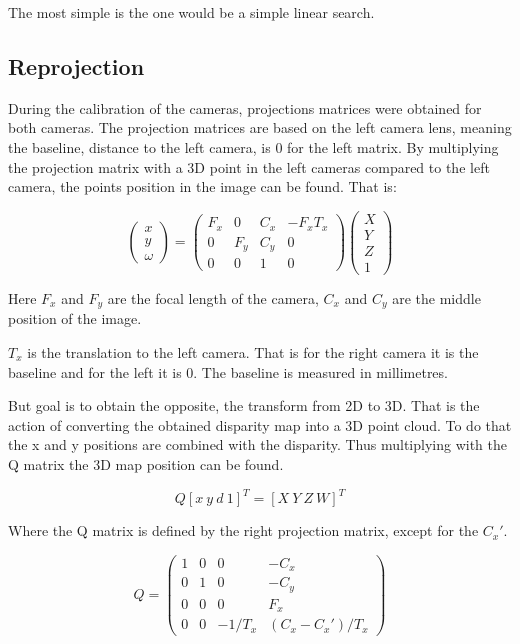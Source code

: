 The most simple is the one would be a simple linear search.

\subsection{Reprojection} \label{sec:reprojection}

During the calibration of the cameras, projections matrices were obtained for both cameras. The projection matrices are based on the left camera lens, meaning the baseline, distance to the left camera, is 0 for the left matrix. By multiplying the projection matrix with a 3D point in the left cameras  compared to the left camera, the points position in the image can be found. That is:

\[ 
\begin{pmatrix}
  x \\
  y \\
  \omega 
 \end{pmatrix}	
 = 
 \begin{pmatrix}
  F_{x} & 0 & C_{x} & -F_{x}T_{x} \\
  0 & F_{y} & C_{y} & 0 \\
  0 & 0 & 1 & 0
 \end{pmatrix}
 \begin{pmatrix}
  X \\
  Y \\
  Z \\
  1 
 \end{pmatrix}	
\]

Here $F_{x}$ and $F_{y}$ are the focal length of the camera, $C_{x}$ and $C_{y}$ are the middle position of the image.

$T_{x}$ is the translation to the left camera. That is for the right camera it is the baseline and for the left it is 0. The baseline is measured in millimetres. 

But goal is to obtain the opposite, the transform from 2D to 3D. That is the action of converting the obtained disparity map into a 3D point cloud. To do that the x and y positions are combined with the disparity. Thus multiplying with the Q matrix the 3D map position can be found.

\[ Q [ x \ y \ d \ 1 ]^{T} = [ X \ Y \ Z \ W ]^{T} \]

Where the Q matrix is defined by the right projection matrix, except for the $C_{x}'$.

\[
Q =
 \begin{pmatrix}
  1 & 0 & 0 & -C_{x} \\
  0 & 1 & 0 & -C_{y} \\
  0 & 0 & 0 & F_{x} \\
  0 & 0 & -1/T_{x} & (C_{x}-C_{x}')/T_{x} 
 \end{pmatrix}
\]

